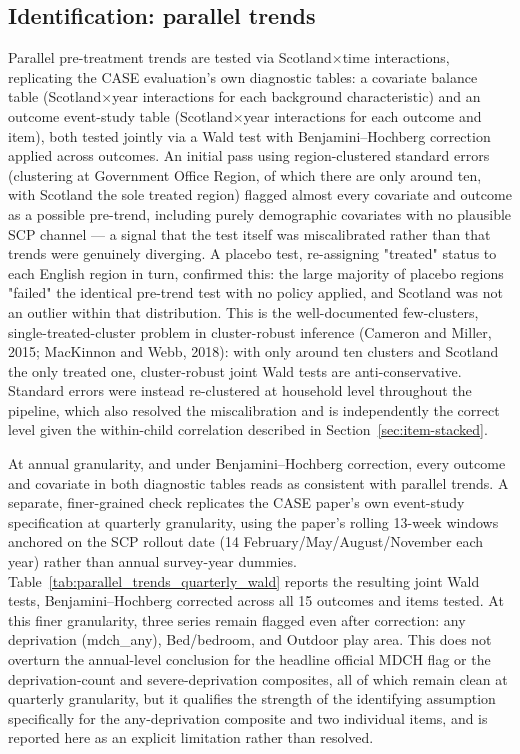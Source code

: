 \subsection{Identification: parallel trends}
\label{sec:parallel-trends}

Parallel pre-treatment trends are tested via Scotland$\times$time interactions, replicating the CASE evaluation's own diagnostic tables: a covariate balance table (Scotland$\times$year interactions for each background characteristic) and an outcome event-study table (Scotland$\times$year interactions for each outcome and item), both tested jointly via a Wald test with Benjamini--Hochberg correction applied across outcomes. An initial pass using region-clustered standard errors (clustering at Government Office Region, of which there are only around ten, with Scotland the sole treated region) flagged almost every covariate and outcome as a possible pre-trend, including purely demographic covariates with no plausible SCP channel --- a signal that the test itself was miscalibrated rather than that trends were genuinely diverging. A placebo test, re-assigning "treated" status to each English region in turn, confirmed this: the large majority of placebo regions "failed" the identical pre-trend test with no policy applied, and Scotland was not an outlier within that distribution. This is the well-documented few-clusters, single-treated-cluster problem in cluster-robust inference (Cameron and Miller, 2015; MacKinnon and Webb, 2018): with only around ten clusters and Scotland the only treated one, cluster-robust joint Wald tests are anti-conservative. Standard errors were instead re-clustered at household level throughout the pipeline, which also resolved the miscalibration and is independently the correct level given the within-child correlation described in Section~\ref{sec:item-stacked}.

At annual granularity, and under Benjamini--Hochberg correction, every outcome and covariate in both diagnostic tables reads as consistent with parallel trends. A separate, finer-grained check replicates the CASE paper's own event-study specification at quarterly granularity, using the paper's rolling 13-week windows anchored on the SCP rollout date (14 February/May/August/November each year) rather than annual survey-year dummies. Table~\ref{tab:parallel_trends_quarterly_wald} reports the resulting joint Wald tests, Benjamini--Hochberg corrected across all 15 outcomes and items tested. At this finer granularity, three series remain flagged even after correction: any deprivation (mdch\_any), Bed/bedroom, and Outdoor play area. This does not overturn the annual-level conclusion for the headline official MDCH flag or the deprivation-count and severe-deprivation composites, all of which remain clean at quarterly granularity, but it qualifies the strength of the identifying assumption specifically for the any-deprivation composite and two individual items, and is reported here as an explicit limitation rather than resolved.

